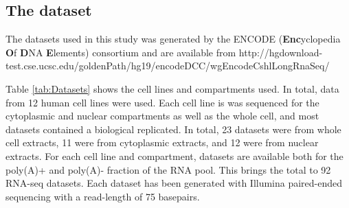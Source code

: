 %









\subsection{The dataset}
The datasets used in this study was generated by the ENCODE
(\textbf{Enc}yclopedia \textbf{O}f \textbf{D}NA \textbf{E}lements) consortium
and are available from http://hgdownload-test.cse.ucsc.edu/goldenPath/hg19/encodeDCC/wgEncodeCshlLongRnaSeq/

Table \ref{tab:Datasets} shows the cell lines and compartments used. In total,
data from 12 human cell lines were used. Each cell line is was sequenced for
the cytoplasmic and nuclear compartments as well as the whole cell, and most
datasets contained a biological replicated. In total, 23 datasets were from
whole cell extracts, 11 were from cytoplasmic extracts, and 12 were from
nuclear extracts. For each cell line and compartment, datasets are available
both for the poly(A)+ and poly(A)- fraction of the RNA pool. This brings the
total to 92 RNA-seq datasets. Each dataset has been generated with Illumina
paired-ended sequencing with a read-length of 75 basepairs.

